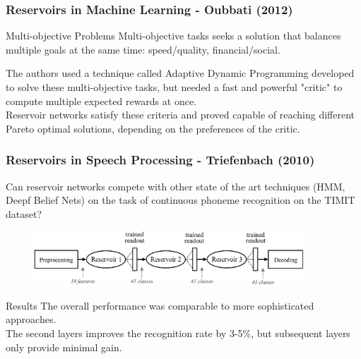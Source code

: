 \documentclass{beamer}
\begin{document}
\begin{frame}
\frametitle{Reservoirs in Machine Learning - Oubbati (2012)}

\begin{block}{Multi-objective Problems}
Multi-objective tasks seeks a solution that balances multiple goals at the same time: speed/quality, financial/social.
\end{block}
\vspace{5mm}

The authors used a technique called Adaptive Dynamic Programming developed to solve these multi-objective tasks, but needed a fast and powerful "critic" to compute multiple expected rewards at once.\\
\vspace{5mm}
Reservoir networks satisfy these criteria and proved capable of reaching different Pareto optimal solutions, depending on the preferences of the critic.

\end{frame}


\begin{frame}
\frametitle{Reservoirs in Speech Processing - Triefenbach (2010)}

Can reservoir networks compete with other state of the art techniques (HMM, Deepf Belief Nets) on the task of continuous phoneme recognition on the TIMIT dataset?
\begin{figure}[!htbp]
\centering
\includegraphics[width=0.9\textwidth]{pictures/layered-res.png}
\end{figure}


\begin{block}{Results}
The overall performance was  comparable to more sophisticated approaches.\\
The second layers improves the recognition rate by 3-5\%, but subsequent layers only provide minimal gain. 
\end{block}
\end{frame}
\end{document}
